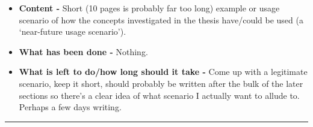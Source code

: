 \begin{itemize}
	\item \textbf{Content -} Short (10 pages is probably far too long) example or usage scenario of how the concepts investigated in the thesis have/could be used (a `near-future usage scenario').
	\item \textbf{What has been done -} Nothing.
	\item \textbf{What is left to do/how long should it take -} Come up with a legitimate scenario, keep it short, should probably be written after the bulk of the later sections so there's a clear idea of what scenario I actually want to allude to. Perhaps a few days writing.
\end{itemize}

\hrule